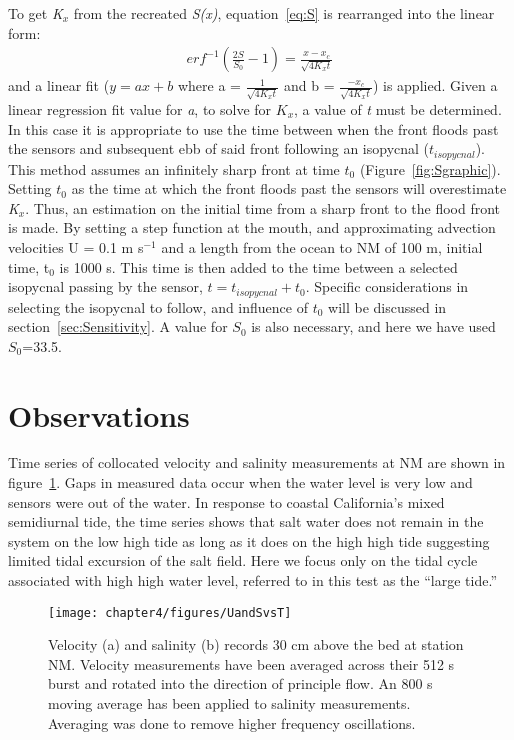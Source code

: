 To get \emph{K$_x$} from the recreated \emph{S(x)}, equation~\ref{eq:S} is rearranged into the linear form:
\begin{eqnarray}
erf^{-1}\left(\frac{2S}{S_0}-1\right) = \frac{x-x_c}{\sqrt{4K_xt}} \label{eq:linfitS}
\end{eqnarray}
and a linear fit ($y = ax + b$ where a = $\frac{1}{\sqrt{4K_xt}}$ and b = $\frac{-x_c}{\sqrt{4K_xt}}$) is applied. Given a linear regression fit value for \emph{a}, to solve for $K_x$, a value of \emph{t} must be determined. In this case it is appropriate to use the time between when the front floods past the sensors and subsequent ebb of said front following an isopycnal ($t_{isopycnal}$). This method assumes an infinitely sharp front at time $t_0$ (Figure~\ref{fig:Sgraphic}). Setting $t_0$ as the time at which the front floods past the sensors will overestimate \emph{K$_x$}. Thus, an estimation on the initial time from a sharp front to the flood front is made. By setting a step function at the mouth, and approximating advection velocities U = 0.1 m s$^{-1}$ and a length from the ocean to NM of 100 m, initial time, t$_0$ is 1000 s. This time is then added to the time between a selected isopycnal passing by the sensor, $t = t_{isopycnal}+t_0$. Specific considerations in selecting the isopycnal to follow, and influence of $t_0$ will be discussed in section~\ref{sec:Sensitivity}. A value for $S_0$ is also necessary, and here we have used $S_0$=33.5.



\section{Observations} \label{sec:ObsCh4}
Time series of collocated velocity and salinity measurements at NM are shown in figure~\ref{fig:UandSvsTch4}. Gaps in measured data occur when the water level is very low and sensors were out of the water. In response to coastal California's mixed semidiurnal tide, the time series shows that salt water does not remain in the system on the low high tide  as long as it does on the high high tide suggesting limited tidal excursion of the salt field. Here we focus only on the tidal cycle associated with high high water level, referred to in this test as the \textquotedblleft large tide.''

\begin{figure}[h]
	\texttt{[image: chapter4/figures/UandSvsT]} 
\caption{Velocity (a) and salinity (b) records 30 cm above the bed at station NM. Velocity measurements have been averaged across their 512 s burst and rotated into the direction of principle flow. An 800 s moving average has been applied to salinity measurements. Averaging was done to remove higher frequency oscillations.} \label{fig:UandSvsTch4}
\end{figure}

